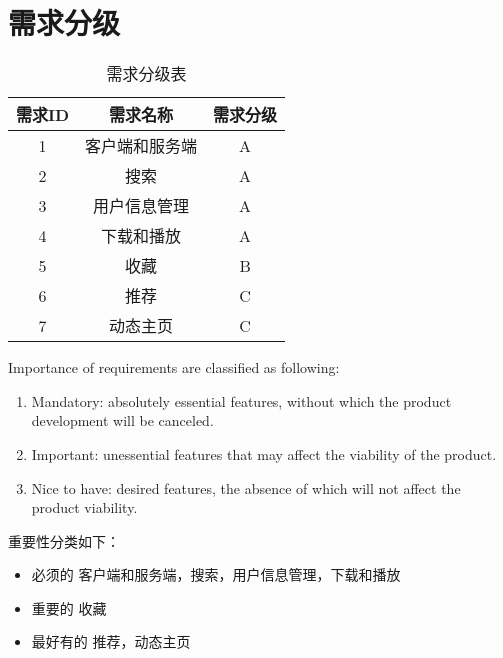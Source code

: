 \chapter{需求分级}
\begin{table}[htbp]
	\centering
	\caption{需求分级表} \label{tab:classification}
	\begin{tabular}{|c|c|c|}
		\hline
		需求ID & 需求名称 & 需求分级 \\
		\hline
		1&客户端和服务端&A \\
		\hline
		2&搜索&A \\
		\hline
		3&用户信息管理&A \\
		\hline
		4&下载和播放&A \\
		\hline
		5&收藏&B\\
		\hline
		6&推荐&C\\
		\hline
		7&动态主页&C\\
		\hline
		
	\end{tabular}
\end{table}

Importance of requirements are classified as following:
\begin{enumerate}
	\item Mandatory: absolutely essential features, without which the product development will be canceled.
	\item Important: unessential features that may affect the viability of the product.
	\item Nice to have: desired features, the absence of which will not affect the product viability.
\end{enumerate}

重要性分类如下：
\begin{itemize}
	\item 必须的		客户端和服务端，搜索，用户信息管理，下载和播放
	\item 重要的	    收藏  
	\item 最好有的		推荐，动态主页
\end{itemize}